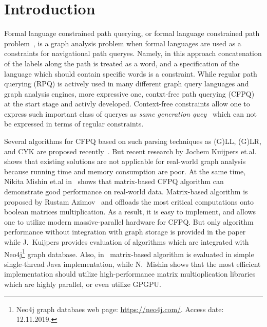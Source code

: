 \section{Introduction}

Formal language constrained path querying, or formal language constrained path problem~\cite{FLCpathProblem}, is a graph analysis problem when formal languages are used as a constraints for navigational path queryes.
Namely, in this approach concatenation of the labels along the path is treated as a word, and a specification of the language which should contain specific words is a constraint.
While regular path querying (RPQ) is actively used in many different graph query languages and graph analysis engines, more expressive one, contxt-free path querying (CFPQ)~\cite{Yannakakis} at the start stage and activly developed.
Context-free constraints allow one to express such important class of queryes as \textit{same generation quey}~\cite{FndDB} which can not be expressed in terms of regular constraints.

Several algorithms for CFPQ based on such parsing techniques as (G)LL, (G)LR, and CYK are proposed recently~\cite{bradford2007quickest,ward2008distributed,bradford2016fast,hellingsPathQuerying,Grigorev:2017:CPQ:3166094.3166104,Verbitskaia:2018:PCC:3241653.3241655,RDF,10.1007/978-3-319-91662-0_17,Medeiros:2018:EEC:3167132.3167265}.
But recent research by Jochem Kuijpers et.al.~\cite{Kuijpers:2019:ESC:3335783.3335791} shows that existing solutions are not applicable for real-world graph analysis because running time and memory consumption are poor.
At the same time, Nikita Mishin et.al in~\cite{Mishin:2019:ECP:3327964.3328503} shows that matrix-based CFPQ algorithm can demonstrate good performance on real-world data.
Matrix-based algorithm is proposed by Rustam Azimov~\cite{Azimov:2018:CPQ:3210259.3210264} and offloads the most critical computations onto boolean matrices multiplication.
As a result, it is easy to implement, and allows one to utilize modern massive-parallel hardware for CFPQ.
But only algorithm performance without integration with graph storage is provided in the paper while J.~Kuijpers provides evaluation of algorithms which are integrated with Neo4j\footnote{Neo4j graph databaes web page: \url{https://neo4j.com/}. Access date: 12.11.2019.} graph database.
Also, in~\cite{Kuijpers:2019:ESC:3335783.3335791} matrix-based algorithm is evaluated in simple single-thread Java implementation, while N.~Mishin shows that the most efficient implementation should utilize high-performance matrix multioplication libraries which are highly parallel, or even utilize GPGPU.


